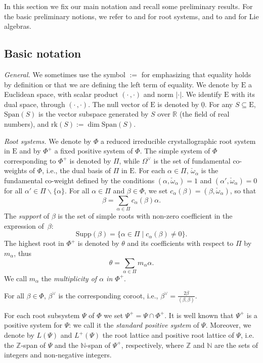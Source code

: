 \documentclass[10pt]{amsart}
\theoremstyle{definition}
\theoremstyle{remark}
\newcommand\smeno{\smallsetminus}
\newcommand\nullvec{\underline 0}
\newcommand\nat{\mathbb N}
\newcommand\ganz{\mathbb Z}
\newcommand\real{\mathbb R}
\newcommand\gen{\mathrm{Span}}
\newcommand\supp{\mathrm{Supp}}
\newcommand\rk{\mathrm{rk}}
\newcommand\al{\alpha}
\newcommand\be{\beta}
\begin{document}
In this section we fix our main notation and recall some preliminary results. 
For the basic preliminary notions, we refer to \cite{Bou} and \cite{HuCox} for root systems, and to \cite{Bou2} and \cite{HuLie} for Lie algebras. 


\subsection{Basic notation}\label{ssec:basic-not}
{\sl General.} We sometimes use the symbol $:=$ for emphasizing  that equality holds by definition or that we are defining the left term of equality.
We denote by $\mathrm E$ a Euclidean space, with scalar product  $(\cdot \,,\cdot )$ and norm $|\cdot |$. We identify $\mathrm E$ with its dual space, through $(\cdot \,,\cdot)$. The null vector of $\mathrm E$ is denoted by $\nullvec$. 
For any $S\subseteq \mathrm E$, $\gen(S)$ is the vector subspace generated by $S$ over $\real$ (the field of real numbers), and $\rk(S):=\dim\gen(S)$.

\par
{\sl Root systems.}
We denote by $\Phi$ a reduced irreducible crystallographic root system in $\mathrm E$ and by $\Phi^+$ a fixed positive system of $\Phi$.
The simple system of $\Phi$ corresponding to  $\Phi^+$ is denoted by $\Pi$,  while $\Omega^\vee$ is the set of fundamental co-weights of $\Phi$, i.e., the  dual basis of $\Pi$ in $\mathrm E$.  
For each $\al\in \Pi$, $\check\omega_\al$ is the fundamental co-weight  defined by the conditions $(\al, \check\omega_\al)=1$ and $(\al', \check \omega_\al)=0$ for all $\al'\in \Pi\smeno \{\al\}$. 
For all $\al\in \Pi$ and $\be \in \Phi$, we set $c_\al(\be)=(\be, \check\omega_\al)$, so that  
$$\be=\sum\limits_{\al\in\Pi}c_\al(\be)\al.$$
The {\it support} of $\be$ is the set of simple roots with non-zero coefficient in the expression of~$\be$: 
$$
\supp(\be)=\{\al\in \Pi\mid c_\al(\be)\neq 0\}.$$
The highest root in $\Phi^+$ is denoted by $\theta$ and its coefficients with respect  to $\Pi$ by $m_\al$, thus
$$\theta=\sum\limits_{\al\in \Pi} m_\al\al.$$ 
We call $m_\al$ the {\it multiplicity of $\al$ in $\Phi^+$}.

\par
For all $\be\in \Phi$, $\be^\vee$ is the corresponding coroot, i.e., $\be^\vee=\frac{2\be}{(\be, \be)}$.

\par
For each root subsystem $\Psi$ of $\Phi$ we set $\Psi^+=\Psi\cap \Phi^+$. 
It is well known that $\Psi^+$ is a positive system for $\Psi$: we call it the {\it standard positive system} of $ \Psi$.
Moreover, we denote by $L(\Psi)$ and $L^+(\Psi)$ the root lattice and positive root lattice of $\Psi$, i.e. the $\ganz$-span of $\Psi$ and the $\nat$-span of $\Psi^+$, respectively, where $\ganz$ and $\nat$ are the sets of integers and non-negative integers. 
\end{document}
